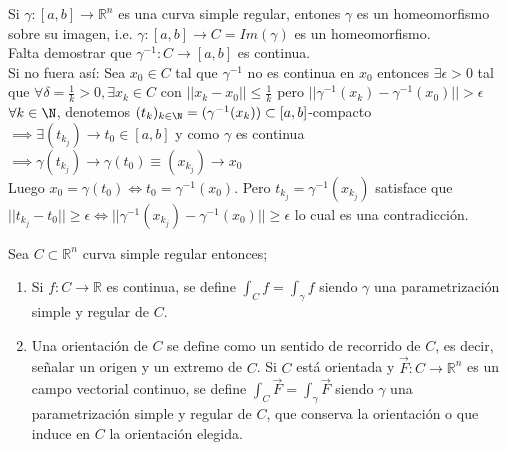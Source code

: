 
\begin{observación}
Si $\gamma: [a,b] \to \mathbb{R}^n$ es una curva simple regular, entones $\gamma$ es un homeomorfismo sobre su imagen, i.e. $\gamma: [a, b] \to C = Im(\gamma)$ es un homeomorfismo. \\
Falta demostrar que $\gamma^{-1}: C \to [a,b]$ es continua.\\
Si no fuera así: Sea $x_0 \in C$ tal que $\gamma^{-1}$ no es continua en $x_0$ entonces $\exists \epsilon > 0$ tal que $\forall \delta = \frac{1}{k} > 0, \exists x_k \in C$ con $ ||x_k - x_0|| \leq \frac{1}{k}$ pero $||\gamma^{-1}(x_k) - \gamma^{-1}(x_0)|| > \epsilon$ \\
$\forall k \in \N$, denotemos $(t_k)_{k \in \N} = (\gamma^{-1}(x_k)) \subset [a,b]$-compacto $\implies \exists (t_{k_j}) \to t_0 \in [a,b]$ y como $\gamma$ es continua $\implies \gamma(t_{k_j}) \to \gamma(t_0) \equiv (x_{k_j}) \to x_0$ \\
Luego $x_0 = \gamma(t_0) \iff t_0 = \gamma^{-1}(x_0)$. Pero $t_{k_j} = \gamma^{-1}(x_{k_j})$ satisface que $||t_{k_j} - t_0|| \geq \epsilon \iff ||\gamma^{-1}(x_{k_j}) - \gamma^{-1}(x_0)|| \geq \epsilon$ lo cual es una contradicción.
\end{observación}

\begin{definición} 
Sea $C \subset \mathbb{R}^n$ curva simple regular entonces;
\begin{enumerate}
    \item Si $f: C \to \mathbb{R}$ es continua, se define $\int_{C} f = \int_{\gamma} f$
          siendo $\gamma$ una parametrización simple y regular de $C$.
    \item Una orientación de $C$ se define como un sentido de recorrido de $C$, es decir,
          señalar un origen y un extremo de $C$. Si $C$ está orientada y $\vec{F}: C \to
              \mathbb{R}^n$ es un campo vectorial continuo, se define $\int_{C} \vec{F} =
              \int_{\gamma} \vec{F}$ siendo $\gamma$ una parametrización simple y regular de
          $C$, que conserva la orientación o que induce en $C$ la orientación elegida.
\end{enumerate}
\end{definición}

